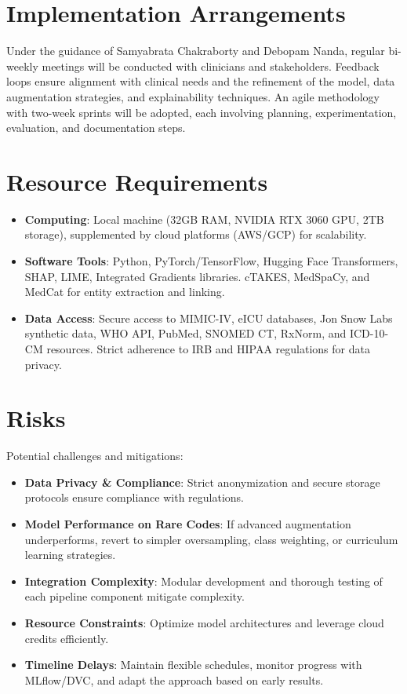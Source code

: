\documentclass[10pt,a4paper]{article}
\begin{document}
\section{Implementation Arrangements}
Under the guidance of Samyabrata Chakraborty and Debopam Nanda, regular bi-weekly meetings will be conducted with clinicians and stakeholders. Feedback loops ensure alignment with clinical needs and the refinement of the model, data augmentation strategies, and explainability techniques. An agile methodology with two-week sprints will be adopted, each involving planning, experimentation, evaluation, and documentation steps.

\section{Resource Requirements}
\begin{itemize}
    \item \textbf{Computing}: Local machine (32GB RAM, NVIDIA RTX 3060 GPU, 2TB storage), supplemented by cloud platforms (AWS/GCP) for scalability.
    \item \textbf{Software Tools}: Python, PyTorch/TensorFlow, Hugging Face Transformers, SHAP, LIME, Integrated Gradients libraries. cTAKES, MedSpaCy, and MedCat for entity extraction and linking.
    \item \textbf{Data Access}: Secure access to MIMIC-IV, eICU databases, Jon Snow Labs synthetic data, WHO API, PubMed, SNOMED CT, RxNorm, and ICD-10-CM resources. Strict adherence to IRB and HIPAA regulations for data privacy.
\end{itemize}

\section{Risks}
Potential challenges and mitigations:
\begin{itemize}
    \item \textbf{Data Privacy \& Compliance}: Strict anonymization and secure storage protocols ensure compliance with regulations.
    \item \textbf{Model Performance on Rare Codes}: If advanced augmentation underperforms, revert to simpler oversampling, class weighting, or curriculum learning strategies.
    \item \textbf{Integration Complexity}: Modular development and thorough testing of each pipeline component mitigate complexity.
    \item \textbf{Resource Constraints}: Optimize model architectures and leverage cloud credits efficiently.
    \item \textbf{Timeline Delays}: Maintain flexible schedules, monitor progress with MLflow/DVC, and adapt the approach based on early results.
\end{itemize}
\end{document}
